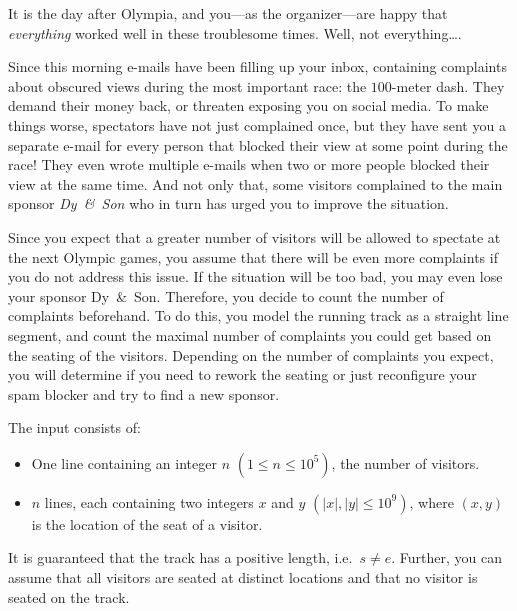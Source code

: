 \providecommand{\maxn}{10^{}}%
\renewcommand{\maxn}{10^{5}}%
\providecommand{\maxd}{10^{}}%
\renewcommand{\maxd}{10^{9}}%
\providecommand{\dysonCompany}{}%
\renewcommand{\dysonCompany}{Dy~\&~Son}%
%
It is the day after Olympia, and you---as the organizer---are happy that \emph{everything} worked well in these troublesome times.
Well, not everything\dots.

Since this morning e-mails have been filling up your inbox, containing complaints about obscured views during the most important race: the \mbox{$100$-meter} dash.
They demand their money back, or threaten exposing you on social media.
To make things worse, spectators have not just complained once, but they have sent you a separate e-mail for every person that blocked their view at some point during the race!
They even wrote multiple e-mails when two or more people blocked their view at the same time.
And not only that, some visitors complained to the main sponsor \emph{\dysonCompany{}} who in turn has urged you to improve the situation. 

Since you expect that a greater number of visitors will be allowed to spectate at the next Olympic games, you assume that there will be even more complaints if you do not address this issue.
If the situation will be too bad, you may even lose your sponsor \dysonCompany{}.
Therefore, you decide to count the number of complaints beforehand.
To do this, you model the running track as a straight line segment, and count the maximal number of complaints you could get based on the seating of the visitors.
Depending on the number of complaints you expect, you will determine if you need to rework the seating or just reconfigure your spam blocker and try to find a new sponsor.

\begin{Input}
	The input consists of:
	\begin{itemize}
        \item One line containing an integer $n$ $(1 \leq n \leq \maxn)$, the number of visitors.
        \item $n$ lines, each containing two integers $x$ and $y$ $(|x|,|y|\leq\maxd)$, where $(x,y)$ is the location of the seat of a visitor.
	\end{itemize}
	It is guaranteed that the track has a positive length, i.e.\ $s\neq e$.
	Further, you can assume that all visitors are seated at distinct locations and that no visitor is seated on the track.
\end{Input}

